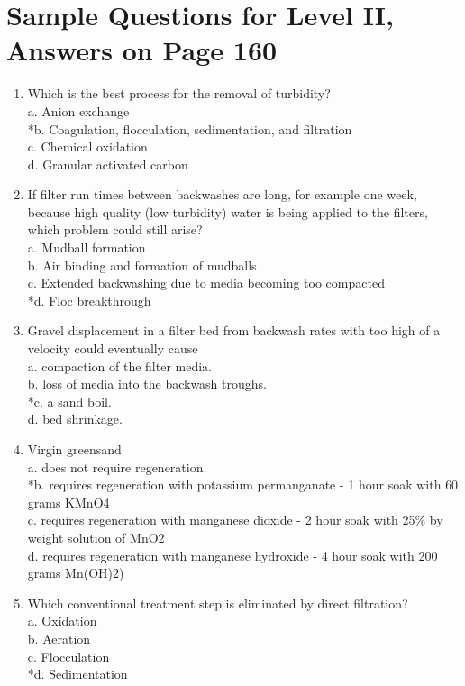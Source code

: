 \section{Sample Questions for Level II, Answers on Page 160}
\begin{enumerate}[label=TII-\arabic*]
  \item Which is the best process for the removal of turbidity?\\
a. Anion exchange\\
*b. Coagulation, flocculation, sedimentation, and filtration\\
c. Chemical oxidation\\
d. Granular activated carbon\\
  \item If filter run times between backwashes are long, for example one week, because high quality (low turbidity) water is being applied to the filters, which problem could still arise?\\
a. Mudball formation\\
b. Air binding and formation of mudballs\\
c. Extended backwashing due to media becoming too compacted\\
*d. Floc breakthrough \\
\item Gravel displacement in a filter bed from backwash rates with too high of a velocity could eventually cause\\
a. compaction of the filter media.\\
b. loss of media into the backwash troughs.\\
*c. a sand boil.\\
d. bed shrinkage.\\
  \item Virgin greensand\\
a. does not require regeneration.\\
*b. requires regeneration with potassium permanganate - 1 hour soak with 60 grams KMnO4\\
c. requires regeneration with manganese dioxide - 2 hour soak with 25\% by weight solution of MnO2\\
d. requires regeneration with manganese hydroxide - 4 hour soak with 200 grams Mn(OH)2)\\
  \item Which conventional treatment step is eliminated by direct filtration?\\
a. Oxidation\\
b. Aeration\\
c. Flocculation\\
*d. Sedimentation\\
\end{enumerate}
